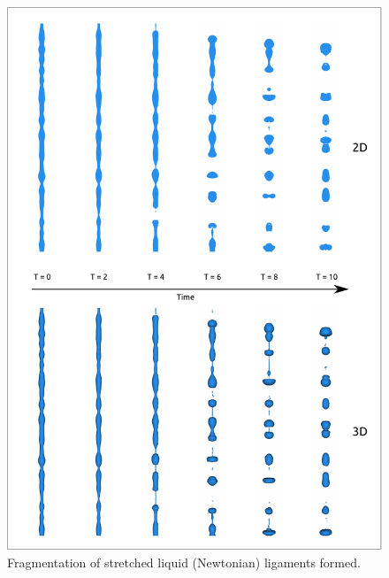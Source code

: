 


\begin{figure}
\centering
\includegraphics{plots/ligament_breakup/3d_vs_2d_short.pdf}
\caption{Fragmentation of stretched liquid (Newtonian) ligaments formed. 
	}
\label{2d_3d_short}
\end{figure}

